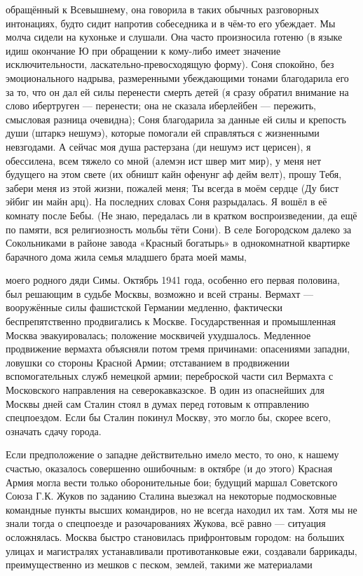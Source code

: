 \label{33-1}
обращённый к Всевышнему, она говорила в таких обычных разговорных интонациях, будто сидит напротив собеседника и в чём-то его убеждает. Мы молча сидели на кухоньке и слушали. Она часто произносила готеню (в языке идиш окончание Ю при обращении к кому-либо имеет значение исключительности, ласкательно-превосходящую форму). Соня спокойно, без эмоционального надрыва, размеренными убеждающими тонами благодарила его за то, что он дал ей силы перенести смерть детей (я сразу обратил внимание на слово 
ибертруген — перенести; она не сказала иберлейбен — пережить, смысловая разница очевидна); Соня благодарила за данные ей силы и крепость души 
(штаркэ нешумэ), которые помогали ей справляться с жизненными невзгодами. А сейчас моя душа растерзана (ди нешумэ ист церисен), я обессилена, всем тяжело со мной (алемэн ист швер мит мир), у меня нет будущего на этом свете (их обништ кайн офенунг аф дейм велт), прошу Тебя, забери меня из этой жизни, пожалей меня; Ты всегда в моём сердце (Ду бист эйбиг ин майн арц). На последних словах Соня разрыдалась. Я вошёл в её комнату после Бебы. (Не знаю, передалась ли в кратком воспроизведении, да ещё по памяти, вся религиозность мольбы тёти Сони). В селе Богородском далеко за Сокольниками в районе завода «Красный богатырь» в однокомнатной квартирке барачного дома жила семья младшего брата моей мамы,

\label{34-1}
моего родного дяди Симы. Октябрь 1941 года, особенно его первая половина, был решающим в судьбе Москвы, возможно и всей страны. Вермахт — вооружённые силы фашистской Германии медленно, фактически беспрепятственно продвигались к Москве. Государственная и промышленная Москва эвакуировалась; положение москвичей ухудшалось. Медленное продвижение вермахта объясняли потом тремя причинами: опасениями западни, ловушки со стороны Красной Армии; отставанием в продвижении вспомогательных служб немецкой армии; переброской части сил Вермахта с Московского направления на северокавказское. В один из опаснейших для Москвы дней сам Сталин стоял в думах перед готовым к отправлению спецпоездом. Если бы Сталин покинул Москву, это могло бы, скорее всего, означать сдачу города.

\label{34-2}
Если предположение о западне действительно имело место, то оно, к нашему счастью, оказалось совершенно ошибочным: в октябре (и до этого) Красная Армия могла вести только оборонительные бои; будущий маршал Советского Союза Г.К. Жуков по заданию Сталина выезжал на некоторые подмосковные командные пункты высших командиров, но не всегда находил их там. Хотя мы не знали тогда о спецпоезде и разочарованиях Жукова, всё равно — ситуация осложнялась. Москва быстро становилась прифронтовым городом: на больших улицах и магистралях устанавливали противотанковые ежи, создавали баррикады, преимущественно из мешков с песком, землей, такими же материалами

